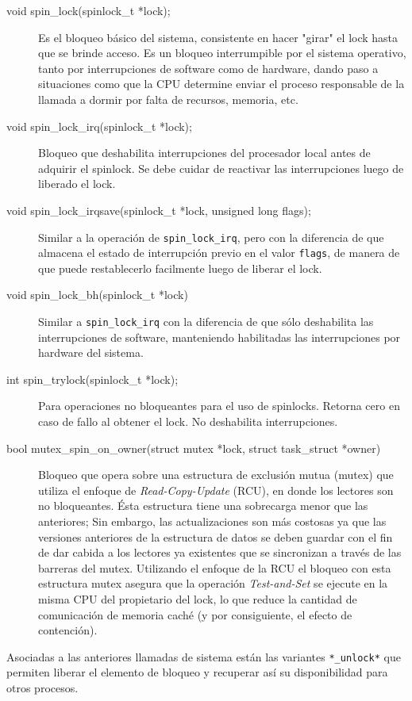 \begin{description}
\item[void spin\_lock(spinlock\_t *lock);] Es el bloqueo básico del sistema, consistente en hacer "girar" el lock hasta que se brinde acceso. Es un bloqueo interrumpible por el sistema operativo, tanto por interrupciones de software como de hardware, dando paso a situaciones como que la CPU determine enviar el proceso responsable de la llamada a dormir por falta de recursos, memoria, etc.
\item[void spin\_lock\_irq(spinlock\_t *lock);] Bloqueo que deshabilita interrupciones del procesador local antes de adquirir el spinlock. Se debe cuidar de reactivar las interrupciones luego de liberado el lock.
\item[void spin\_lock\_irqsave(spinlock\_t *lock, unsigned long flags);] Similar a la operación de \verb=spin_lock_irq=, pero con la diferencia de que almacena el estado de interrupción previo en el valor \verb=flags=, de manera de que puede restablecerlo facilmente luego de liberar el lock.
\item[void spin\_lock\_bh(spinlock\_t *lock)] Similar a \verb=spin_lock_irq= con la diferencia de que sólo deshabilita las interrupciones de software, manteniendo habilitadas las interrupciones por hardware del sistema.
\item[int spin\_trylock(spinlock\_t *lock);] Para operaciones no bloqueantes para el uso de spinlocks. Retorna cero en caso de fallo al obtener el lock. No deshabilita interrupciones.
\item[bool mutex\_spin\_on\_owner(struct mutex *lock, struct task\_struct *owner)] Bloqueo que opera sobre una estructura de exclusión mutua (mutex) que utiliza el enfoque de \emph{Read-Copy-Update} (RCU), en donde los lectores son no bloqueantes. Ésta estructura tiene una sobrecarga menor que las anteriores; Sin embargo, las actualizaciones son más costosas ya que las versiones anteriores de la estructura de datos se deben guardar con el fin de dar cabida a los lectores ya existentes que se sincronizan a través de las barreras del mutex. Utilizando el enfoque de la RCU el bloqueo con esta estructura mutex asegura que la operación \emph{Test-and-Set} se ejecute en la misma CPU del propietario del lock, lo que reduce la cantidad de comunicación de memoria caché (y por consiguiente, el efecto de contención).
\end{description}

Asociadas a las anteriores llamadas de sistema están las variantes \verb=*_unlock*= que permiten liberar el elemento de bloqueo y recuperar así su disponibilidad para otros procesos.

